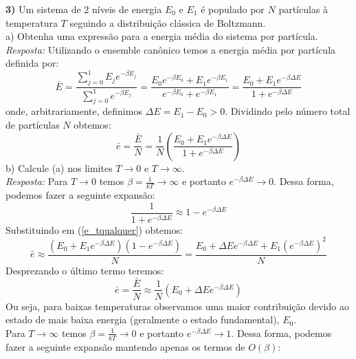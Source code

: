 \documentclass[11pt,leqno]{article}
\begin{document}
\noindent
{\bf 3)} Um sistema de 2 níveis de energia $E_{0}$  e $E_{1}$ é populado por $N$ partículas à temperatura $T$ seguindo a distribuição clássica de Boltzmann.\\
a) Obtenha uma expressão para a energia média do sistema por partícula.\\
{\it Resposta:} Utilizando o ensemble can\^onico temos a energia média por partícula definida por:
\begin{equation}
\bar{E}=\frac{\sum_{j=0}^{1} E_{j} e^{-\beta E_{j}}}{\sum_{j=0}^{1}e^{-\beta E_{j}}}=\frac{E_{0} e^{-\beta E_{0}} + E_{1} e^{-\beta E_{1}}}{e^{-\beta E_{0}} + e^{-\beta E_{1}}}= \frac{E_{0} + E_{1} e^{-\beta \Delta E}}{1 + e^{-\beta \Delta E}}
\nonumber
\end{equation}
onde, arbitrariamente, definimos $\Delta E=E_{1}-E_{0}>0$. Dividindo pelo número total de partículas $N$ obtemos:\\
\begin{equation}
\bar{e}=\frac{\bar{E}}{N} = \frac{1}{N} \left(\frac{E_{0} + E_{1} e^{-\beta \Delta E}}{1 + e^{-\beta \Delta E}}\right)
\label{e_tqualquer}
\end{equation}
b) Calcule (a) nos limites $T \rightarrow 0$ e $T \rightarrow \infty$.\\
{\it Resposta:} Para $T \rightarrow 0$ temos $\beta=\frac{1}{kT} \rightarrow \infty$ e portanto $e^{-\beta \Delta E} \rightarrow 0$. Dessa forma, podemos fazer a seguinte expansão:
\begin{equation}
\frac{1}{1 + e^{-\beta \Delta E}} \approx 1-e^{-\beta \Delta E}
\nonumber
\end{equation}
Substituindo em (\ref{e_tqualquer}) obtemos:
\begin{equation}
\bar{e} \approx \frac{(E_{0} + E_{1} e^{-\beta \Delta E})(1-e^{-\beta \Delta E})}{N} =
\frac{E_{0}+\Delta E e^{-\beta \Delta E} + E_{1} (e^{-\beta \Delta E})^{2}}{N} \nonumber
\end{equation}
Desprezando o último termo teremos:
\begin{equation}
\bar{e}=\frac{\bar{E}}{N} \approx \frac{1}{N} (E_{0}+\Delta E e^{-\beta \Delta E}) 
\label{e_tzero}
\end{equation}
Ou seja, para baixas temperaturas observamos uma maior contribuição devido ao estado de mais baixa energia (geralmente o estado fundamental), $E_{0}$.\\
Para $T \rightarrow \infty$ temos $\beta=\frac{1}{kT} \rightarrow 0$ e portanto $e^{-\beta \Delta E} \rightarrow 1$. Dessa forma, podemos fazer a seguinte expansão mantendo apenas os termos de $O(\beta)$:
\end{document}
